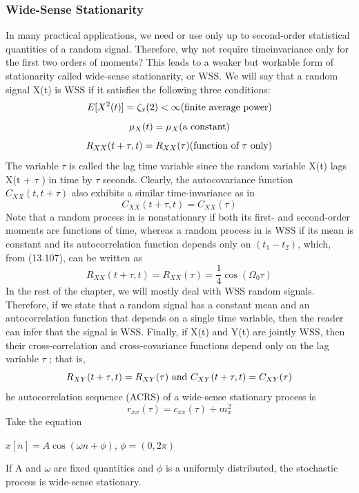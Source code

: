 \documentclass{article}
\begin{document}
\subsubsection{Wide-Sense Stationarity}
In many practical applications, we need or use only up to second-order
statistical quantities of a random signal. Therefore, why not require timeinvariance only for the first two orders of moments? This leads to a weaker
but workable form of stationarity called wide-sense stationarity, or WSS.
We will say that a random signal X(t) is WSS if it satisfies the following
three conditions:
\begin{equation}
E[X^2(t)]= \zeta_x(2) < \infty \space \space \text{(finite average power)}
\end{equation}
\begin{equation}
\mu_X(t) = \mu_X \space \space \text{(a constant)}
\end{equation}
\begin{equation}
R_{XX}(t+\tau,t) = R_{XX}(\tau) \space \space \text{(function of $\tau$ only)}
\end{equation}
The variable $\tau$ is called the lag time variable since the random variable
X(t) lags X(t +  $\tau$ ) in time by  $\tau$ seconds. Clearly, the autocovariance function $C_{XX}(t, t + \tau )$ also exhibits a similar time-invariance as in
\begin{equation}
C_{XX}(t+\tau,t) = C_{XX}(\tau)
\end{equation}
Note that a random process in is nonstationary if
both its first- and second-order moments are functions of time, whereas
a random process in is WSS if its mean is constant
and its autocorrelation function depends only on $(t_1 - t_2)$, which, from
(13.107), can be written as 
\begin{equation}
R_{XX}(t+\tau,t) = R_{XX}(\tau) = \frac{1}{4}\cos(\Omega_0\tau)    
\end{equation}
In the rest of the chapter, we will mostly deal with WSS random
signals. Therefore, if we state that a random signal has a constant mean
and an autocorrelation function that depends on a single time variable,
then the reader can infer that the signal is WSS.
Finally, if X(t) and Y(t) are jointly WSS, then their cross-correlation
and cross-covariance functions depend only on the lag variable $\tau$ ; that is,
\begin{equation}
R_{XY}(t+\tau,t)= R_{XY}(\tau) \space \space \text{  and } \space \space C_{XY}(t+\tau,t) = C_{XY}(\tau)
\end{equation}
he autocorrelation sequence (ACRS) of a wide-sense stationary process is
\begin{equation}
r_{xx}(\tau)=c_{xx}(\tau)+m^2_x
\end{equation}
Take the equation 
\begin{center}
$x[n] = A\cos(\omega n + \phi)$, $\phi =(0,2\pi)$
\end{center}
If A and $\omega$ are fixed quantities and $\phi$ is a uniformly distributed, the stochastic process is wide-sense stationary.
\end{document}
